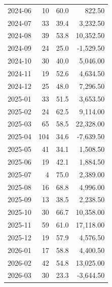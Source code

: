 \documentclass[11pt,a4paper,twoside]{article}
\begin{document}
\begin{center}
\begin{tabular}{>{\color{txtmain}}l rrr}
2024-06 & 10 & 60.0 & \textcolor{wingreen}{822.50} \\
2024-07 & 33 & 39.4 & \textcolor{wingreen}{3,232.50} \\
2024-08 & 39 & 53.8 & \textcolor{wingreen}{10,352.50} \\
2024-09 & 24 & 25.0 & \textcolor{lossred}{-1,529.50} \\
2024-10 & 30 & 40.0 & \textcolor{wingreen}{5,046.00} \\
2024-11 & 19 & 52.6 & \textcolor{wingreen}{4,634.50} \\
2024-12 & 25 & 48.0 & \textcolor{wingreen}{7,296.50} \\
2025-01 & 33 & 51.5 & \textcolor{wingreen}{3,653.50} \\
2025-02 & 24 & 62.5 & \textcolor{wingreen}{9,114.00} \\
2025-03 & 65 & 58.5 & \textcolor{wingreen}{22,328.00} \\
2025-04 & 104 & 34.6 & \textcolor{lossred}{-7,639.50} \\
2025-05 & 41 & 34.1 & \textcolor{wingreen}{1,508.50} \\
2025-06 & 19 & 42.1 & \textcolor{wingreen}{1,884.50} \\
2025-07 & 4 & 75.0 & \textcolor{wingreen}{2,389.00} \\
2025-08 & 16 & 68.8 & \textcolor{wingreen}{4,996.00} \\
2025-09 & 13 & 38.5 & \textcolor{wingreen}{2,238.50} \\
2025-10 & 30 & 66.7 & \textcolor{wingreen}{10,358.00} \\
2025-11 & 59 & 61.0 & \textcolor{wingreen}{17,118.00} \\
2025-12 & 19 & 57.9 & \textcolor{wingreen}{4,576.50} \\
2026-01 & 17 & 58.8 & \textcolor{wingreen}{4,400.50} \\
2026-02 & 42 & 54.8 & \textcolor{wingreen}{13,025.00} \\
2026-03 & 30 & 23.3 & \textcolor{lossred}{-3,644.50} \\
\bottomrule
\end{tabular}
\end{center}
\end{document}
